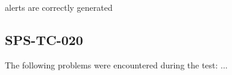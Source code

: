 alerts are correctly generated


\subsection{SPS-TC-020}
\label{sec:tc-020}

The following problems were encountered during the test: ...
